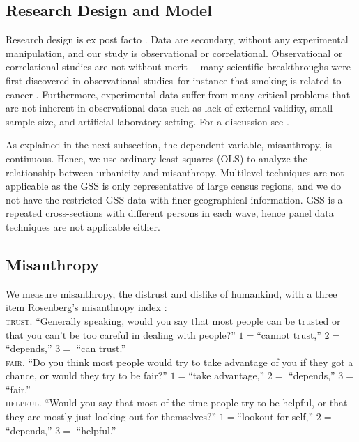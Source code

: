 \documentclass[11pt, letterpaper]{article}
\begin{document}
\begin{spacing}{1.4}
\section*{Research Design and Model}

Research design is  ex post facto \citep{mohr95}. Data are secondary,
without any experimental manipulation, and our study is observational or correlational.  
Observational or correlational studies are not
without merit%
---many scientific breakthroughs were first
discovered in observational studies--for instance that smoking is
related to cancer \citep[e.g.,][]{blanchflower11,oswald14}.
 Furthermore, experimental data %
 suffer from many critical problems that are not inherent in
observational data such as lack of external validity, small sample size, and  
artificial laboratory setting. %
For a discussion see  \citet{pawson97}.

As explained in the next subsection, the dependent variable, misanthropy, is
continuous. Hence, we  use ordinary least squares (OLS) to analyze the
relationship between urbanicity and  misanthropy.
Multilevel techniques are not applicable  as the GSS is only representative of
large census regions, and we do not have the restricted GSS data with finer
geographical information.
 GSS is a repeated cross-sections with different persons in each wave, hence
 panel data techniques are not applicable either. 

\subsection*{Misanthropy}

We measure misanthropy, the distrust and dislike of humankind, with a three item  Rosenberg's  misanthropy index \citep{rosenberg56,smith97}:\\

\indent\textsc{trust}. ``Generally speaking, would you say that most people can be trusted or that you can't be too
careful in dealing with people?''  $1=$``cannot trust,'' $2=$     ``depends,'' $3=$   ``can trust.''\\
\indent\textsc{fair}. ``Do you think most people would try to take advantage of you if they got a chance, or
would they try to be fair?'' $1=$``take advantage,'' $2=$       ``depends,'' $3=$          ``fair.'' \\
\indent\textsc{helpful}. ``Would you say that most of the time people try to be helpful, or that they are mostly just
looking out for themselves?'' $1=$``lookout for self,'' $2=$       ``depends,'' $3=$        ``helpful.''\\ 


\end{spacing}
\end{document}
